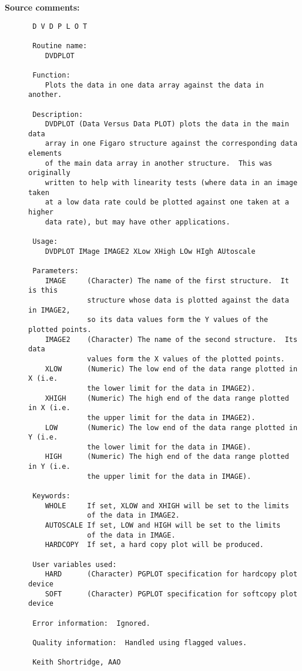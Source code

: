 \begin{description}
\item [{\bf Source comments:}]
\begin{verbatim}
 D V D P L O T

 Routine name:
    DVDPLOT

 Function:
    Plots the data in one data array against the data in another.

 Description:
    DVDPLOT (Data Versus Data PLOT) plots the data in the main data
    array in one Figaro structure against the corresponding data elements
    of the main data array in another structure.  This was originally
    written to help with linearity tests (where data in an image taken
    at a low data rate could be plotted against one taken at a higher
    data rate), but may have other applications.

 Usage:
    DVDPLOT IMage IMAGE2 XLow XHigh LOw HIgh AUtoscale

 Parameters:
    IMAGE     (Character) The name of the first structure.  It is this
              structure whose data is plotted against the data in IMAGE2,
              so its data values form the Y values of the plotted points.
    IMAGE2    (Character) The name of the second structure.  Its data
              values form the X values of the plotted points.
    XLOW      (Numeric) The low end of the data range plotted in X (i.e.
              the lower limit for the data in IMAGE2).
    XHIGH     (Numeric) The high end of the data range plotted in X (i.e.
              the upper limit for the data in IMAGE2).
    LOW       (Numeric) The low end of the data range plotted in Y (i.e.
              the lower limit for the data in IMAGE).
    HIGH      (Numeric) The high end of the data range plotted in Y (i.e.
              the upper limit for the data in IMAGE).

 Keywords:
    WHOLE     If set, XLOW and XHIGH will be set to the limits
              of the data in IMAGE2.
    AUTOSCALE If set, LOW and HIGH will be set to the limits
              of the data in IMAGE.
    HARDCOPY  If set, a hard copy plot will be produced.

 User variables used:
    HARD      (Character) PGPLOT specification for hardcopy plot device
    SOFT      (Character) PGPLOT specification for softcopy plot device

 Error information:  Ignored.

 Quality information:  Handled using flagged values.

 Keith Shortridge, AAO
\end{verbatim}
\end{description}
